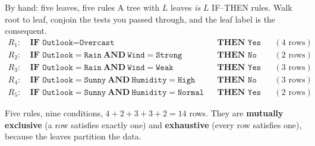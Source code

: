 \documentclass[aspectratio=169]{beamer}
\begin{document}
\begin{frame}[shrink=8]{By hand: five leaves, five rules}
A tree with $L$ leaves \emph{is} $L$ IF--THEN rules. Walk root to leaf,
conjoin the tests you passed through, and the leaf label is the consequent.
\begin{align*}
  R_1:\ &\textbf{IF } \texttt{Outlook} = \texttt{Overcast}
    &&\textbf{THEN } \texttt{Yes} && (4\text{ rows})\\
  R_2:\ &\textbf{IF } \texttt{Outlook} = \texttt{Rain}
    \ \textbf{AND}\ \texttt{Wind} = \texttt{Strong}
    &&\textbf{THEN } \texttt{No} && (2\text{ rows})\\
  R_3:\ &\textbf{IF } \texttt{Outlook} = \texttt{Rain}
    \ \textbf{AND}\ \texttt{Wind} = \texttt{Weak}
    &&\textbf{THEN } \texttt{Yes} && (3\text{ rows})\\
  R_4:\ &\textbf{IF } \texttt{Outlook} = \texttt{Sunny}
    \ \textbf{AND}\ \texttt{Humidity} = \texttt{High}
    &&\textbf{THEN } \texttt{No} && (3\text{ rows})\\
  R_5:\ &\textbf{IF } \texttt{Outlook} = \texttt{Sunny}
    \ \textbf{AND}\ \texttt{Humidity} = \texttt{Normal}
    &&\textbf{THEN } \texttt{Yes} && (2\text{ rows})
\end{align*}
\begin{center}\small
  Five rules, nine conditions, $4+2+3+3+2 = 14$ rows. They are
  \textbf{mutually exclusive} (a row satisfies exactly one) and
  \textbf{exhaustive} (every row satisfies one), because the leaves partition
  the data.
\end{center}
\end{frame}
\end{document}
